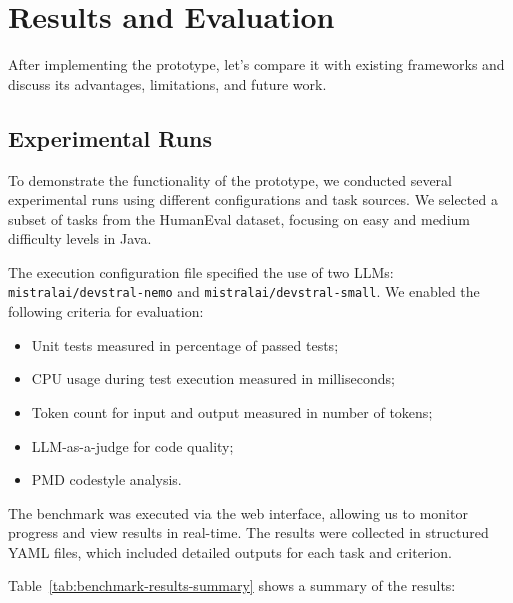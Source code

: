 \section{Results and Evaluation}

After implementing the prototype, let's compare it with existing frameworks and discuss its advantages, limitations, and future work.

\subsection{Experimental Runs}

To demonstrate the functionality of the prototype, we conducted several experimental runs using different configurations and task sources.
We selected a subset of tasks from the HumanEval dataset, focusing on easy and medium difficulty levels in Java.

The execution configuration file specified the use of two LLMs: \texttt{mistralai/devstral-nemo} and \texttt{mistralai/devstral-small}.
We enabled the following criteria for evaluation:
\begin{itemize}
    \item Unit tests measured in percentage of passed tests;
    \item CPU usage during test execution measured in milliseconds;
    \item Token count for input and output measured in number of tokens;
    \item LLM-as-a-judge for code quality;
    \item PMD codestyle analysis.
\end{itemize}

The benchmark was executed via the web interface, allowing us to monitor progress and view results in real-time.
The results were collected in structured YAML files, which included detailed outputs for each task and criterion.

Table~\ref{tab:benchmark-results-summary} shows a summary of the results:

